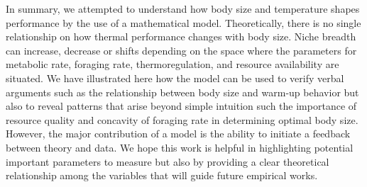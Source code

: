 In summary, we attempted to understand how body size and temperature shapes performance by the use of a mathematical model.
Theoretically, there is no single relationship on how thermal performance changes with body size.
Niche breadth can increase, decrease or shifts depending on the space where the parameters for metabolic rate, foraging rate, thermoregulation, and resource availability are situated.
We have illustrated here how the model can be used to verify verbal arguments such as the relationship between body size and warm-up behavior but also to reveal patterns that arise beyond simple intuition such the importance of resource quality and concavity of foraging rate in determining optimal body size.
However, the major contribution of a model is the ability to initiate a feedback between theory and data.
We hope this work is helpful in highlighting potential important parameters to measure but also by providing a clear theoretical relationship among the variables that will guide future empirical works.




%
%
%
 
